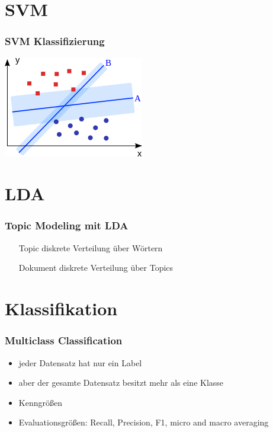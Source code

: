 \documentclass[12pt, xcolor=table]{beamer}
\begin{document}
\section{SVM} %
\label{sec:SVM}

\begin{frame}
    \frametitle{SVM Klassifizierung}
    \begin{center}
    \includegraphics[scale=0.75]{figures/Svm_intro.png}
    \end{center}
\end{frame}

\section{LDA} %
\label{sec:LDA}

\begin{frame}
    \frametitle{Topic Modeling mit LDA}
    \begin{itemize}
        \item[Topic] diskrete Verteilung über Wörtern
        \item[Dokument] diskrete Verteilung über Topics
    \end{itemize}
\end{frame}
\section{Klassifikation} %
\label{sec:Klassifikation}

\begin{frame}
    \frametitle{Multiclass Classification}
    \begin{itemize}
        \item jeder Datensatz hat nur ein Label
        \item aber der gesamte Datensatz besitzt mehr als eine Klasse
        \item Kenngrößen
        \item Evaluationsgrößen: Recall, Precision, F1, micro and macro averaging
    \end{itemize}
\end{frame}
\end{document}
